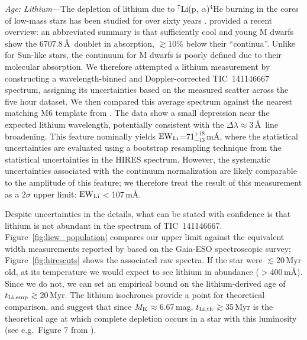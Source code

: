 \documentclass{nature3}
\begin{document}
\begin{methods}
{\it Age: Lithium}---The depletion of lithium due to $^7$Li(p,
$\alpha$)$^4$He burning in the cores of low-mass stars has been studied
for over sixty years \cite{Hayashi1963,Bildsten1997,Burke2004}.
\cite{Wood2023} provided a recent overview: an abbreviated
summary is that sufficiently cool and young M dwarfs show the 6707.8\,\AA\
doublet in absorption, $\gtrsim$10\% below their ``continua''.  Unlike
for Sun-like stars, the continuum for M dwarfs is poorly defined due to
their molecular absorption.  We therefore attempted a lithium measurement by
constructing a wavelength-binned and Doppler-corrected TIC~141146667
spectrum, assigning its uncertainties based on the measured scatter
across the five hour dataset.  We then compared this average spectrum
against the nearest matching M6 template from \cite{Bochanski2007}.  The
data show a small depression near the expected lithium wavelength,
potentially consistent with the $\Delta \lambda$$\approx$3\,\AA\ line
broadening.  This feature nominally yields ${\rm EW}_{\rm
Li}$=71$^{+18}_{-13}$\,m\AA, where the statistical uncertainties are
evaluated using a bootstrap resampling technique from the statistical
uncertainties in the HIRES spectrum.  However, the systematic uncertainties associated
with the continuum normalization are likely comparable to
the amplitude of this feature; we therefore treat the result of this
measurement as a $2\sigma$ upper limit: ${\rm EW}_{\rm Li}$$<$107\,m\AA.

Despite uncertainties in the details, what can be stated with confidence
is that lithium is not abundant in the spectrum of TIC~141146667.
Figure~\ref{fig:liew_population} compares our upper limit against the
equivalent width measurements reported by \cite{Jeffries2023}
based on the Gaia-ESO spectroscopic survey; Figure~\ref{fig:hirescuts}
shows the associated raw spectra.  If the star were $\lesssim$20\,Myr
old, at its temperature we would expect to see lithium in abundance
($>$400\,m\AA).  Since we do not, we can set an empirical bound on the
lithium-derived age of $t_{\rm Li,emp}$$\gtrsim$20\,Myr.  The
\cite{Feiden2016} lithium isochrones provide a point for theoretical
comparison, and suggest that since $M_{\rm K}$$\approx$6.67\,mag,
$t_{\rm Li,th}$$\gtrsim$35\,Myr is the theoretical age at which
complete depletion occurs in a star with this luminosity (see
e.g.~Figure 7 from \cite{Wood2023}).




\end{methods}
\end{document}
